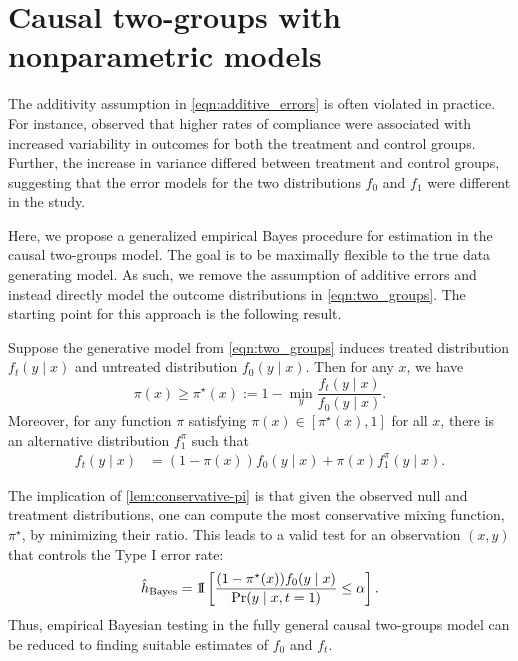 \section{Causal two-groups with nonparametric models}
\label{sec:kernel_generalized}
The additivity assumption in \cref{eqn:additive_errors} is often violated in practice. For instance, \citet{efron:feldman:1991:compliance} observed that higher rates of compliance were associated with increased variability in outcomes for both the treatment and control groups. Further, the increase in variance differed between treatment and control groups, suggesting that the error models for the two distributions $f_0$ and $f_1$ were different in the study.

Here, we propose a generalized empirical Bayes procedure for estimation in the causal two-groups model. The goal is to be maximally flexible to the true data generating model. As such, we remove the assumption of additive errors and instead directly model the outcome distributions in \cref{eqn:two_groups}. The starting point for this approach is the following result.
\begin{lemma}
\label{lem:conservative-pi}
Suppose the generative model from \cref{eqn:two_groups} induces treated distribution $f_t(y \mid x)$ and untreated distribution $f_0(y \mid x)$. Then for any $x$, we have
\[ \pi(x) \geq \pi^\star(x) := 1 - \min_y \frac{f_t(y \mid x)}{f_0(y \mid x)}. \]
Moreover, for any function $\pi$ satisfying $\pi(x) \in [\pi^\star(x), 1]$ for all $x$, there is an alternative distribution $f^\pi_1$ such that
\begin{align*}
f_t(y \mid x) &= (1-\pi(x)) f_0(y \mid x) + \pi(x) f^\pi_1(y \mid x).
\end{align*}
\end{lemma}
The implication of \cref{lem:conservative-pi} is that given the observed null and treatment distributions, one can compute the most conservative mixing function, $\pi^\star$, by minimizing their ratio. This leads to a valid test for an observation $(x,y)$ that controls the Type I error rate:
\begin{equation}
\label{eqn:general-bayes-test}
    \hat{h}_{\text{Bayes}} = \operatorname*{1{\hskip -2.5 pt}\hbox{I}}\left[ \frac{(1 -\pi^\star(x)) f_0(y \mid x) }{\textnormal{Pr}(y \mid x, t=1)} \leq \alpha  \right] .
\end{equation}
Thus, empirical Bayesian testing in the fully general causal two-groups model can be reduced to finding suitable estimates of $f_0$ and $f_t$.

